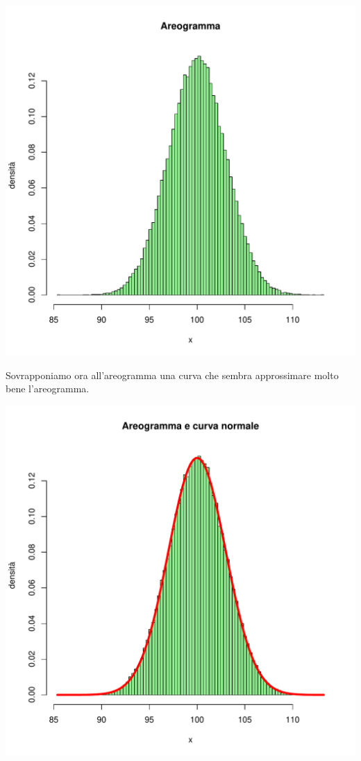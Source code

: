 \documentclass[onecolumn,12pt]{book}\usepackage[]{graphicx}\usepackage[]{color}
\makeatletter
\def\maxwidth{ %
  \ifdim\Gin@nat@width>\linewidth
    \linewidth
  \else
    \Gin@nat@width
  \fi
}
\newenvironment{knitrout}{}{} %
\makeatother
\begin{document}
\begin{knitrout}
\color{fgcolor}
\includegraphics[width=\maxwidth]{figure/unnamed-chunk-134-1} 

\end{knitrout}

Sovrapponiamo ora all'areogramma una curva che sembra approssimare molto bene l'areogramma. 


\begin{knitrout}
\color{fgcolor}
\includegraphics[width=\maxwidth]{figure/unnamed-chunk-135-1} 

\end{knitrout}
\end{document}
